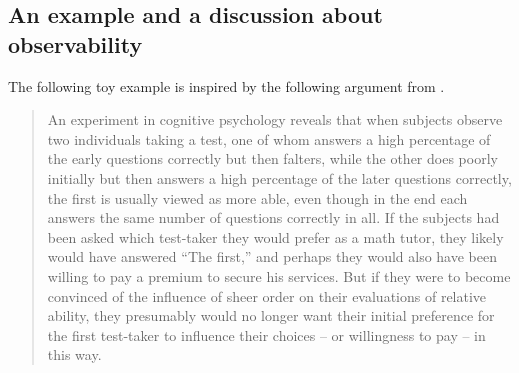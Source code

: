 \documentclass[version=last, pagesize, twoside=off, bibliography=totoc, DIV=calc, fontsize=12pt, a4paper, french, english]{scrartcl}
\begin{document}
\subsection{An example and a discussion about observability}
The following toy example is inspired by the following argument from \citet[p.~59]{railton_facts_2003}.
\begin{quote}
  An experiment in cognitive psychology reveals that when subjects observe two individuals taking a test, one of whom answers a high percentage of the early questions correctly but then falters, while the other does
  poorly initially but then answers a high percentage of the later questions
  correctly, the first is usually viewed as more able, even though in the end
  each answers the same number of questions correctly in all. If the subjects had been asked which test-taker they would prefer as a math tutor,
  they likely would have answered “The first,” and perhaps they would also
  have been willing to pay a premium to secure his services. But if they
  were to become convinced of the influence of sheer order on their evaluations of relative ability, they presumably would no longer want their
  initial preference for the first test-taker to influence their choices – or
  willingness to pay – in this way.
\end{quote}
\end{document}
